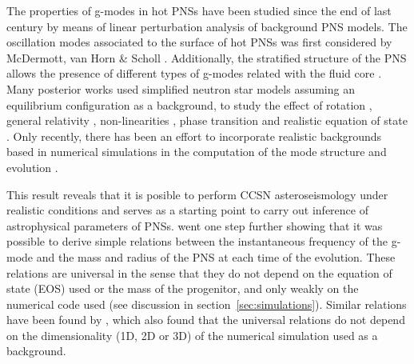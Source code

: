  
 The {properties of} g-modes in hot {PNSs} have been studied since the end of last century {by means of linear perturbation analysis of background PNS models}. The oscillation modes {associated to} the surface of hot PNSs was first considered by McDermott, van Horn \& Scholl \cite{McDermott:1983}. Additionally, the stratified structure of the PNS allows the presence of different types of g-modes related with the fluid core \cite{Reisenegger:1992}. Many posterior works used simplified neutron star models assuming an equilibrium configuration {as a background}, to study the effect of rotation \cite{Ferrari:2004}, general relativity \cite{Passamonti:2005}, non-linearities \cite{Dimmelmeier:2006}, phase transition \cite{Kruger:2015} and realistic equation of state \cite{Camelio:2017}. {Only recently, there has been an effort to incorporate realistic backgrounds based in numerical simulations in the computation of the mode structure and evolution \cite{Sotani:2016,Torres:2018, Morozova:2018, Torres:2019a,Torres:2019b,Sotani:2019,WS:2019,Sotani:2020a, Sotani:2020b}}.
 
This result reveals that it is posible to perform CCSN asteroseismology {under realistic conditions} and serves as a starting point to carry out inference of astrophysical parameters of PNSs.  {\cite{Torres:2019b} went one step further showing that it was possible to derive simple relations} between the { instantaneous frequency of the g-mode and} the mass and radius of the PNS {at each time of the evolution}. These relations are universal in the sense that they do not depend {on the equation of state (EOS) used} or the mass of the progenitor, {and only weakly on} the numerical code used {(see discussion in section~\ref{sec:simulations})}. {Similar relations have been found by \cite{Sotani:2020a,Sotani:2020b}, which also found that the universal relations do not depend on the dimensionality (1D, 2D or 3D) of the numerical simulation used as a background.}
 

